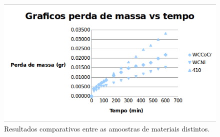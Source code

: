 \begin{figure}
	\centering
	\includegraphics[width=1\columnwidth]{method/figs/adequacao/adequacao6.png}
    \caption{Resultados comparativos entre as amoostras de materiais distintos.}
    \label{fig:adequacao6}
\end{figure}

